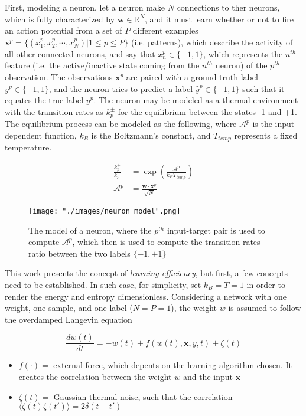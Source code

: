 First, modeling a neuron, let a neuron make $N$ connections to ther neurons, which is fully characterized by $\bm{w} \in \mathbb{R}^N$, and it must learn whether or not to fire an action potential from a set of $P$ different examples $\bm{x}^p = \{ (x_1^p,x_2^p,\cdots,x_N^p) | 1\leq p \leq P \}$ (i.e. patterns), which describe the activity of all other connected neurons, and say that $x^p_n \in \{ -1, 1\}$, which represents the $n^{th}$ feature (i.e. the active/inactive state coming from the $n^{th}$ neuron) of the $p^{th}$ observation. The observations $\bm{x}^p$ are paired with a ground truth label $y^p \in \{-1,1\}$, and the neuron tries to predict a label $\hat{y}^p \in \{-1,1\}$ such that it equates the true label $y^p$. The neuron may be modeled as a thermal environment with the transition rates as $k_p^\pm$ for the equilibrium between the states -1 and +1. The equilibrium process can be modeled as the following, where $\mathcal{A}^p$ is the input-dependent function, $k_B$ is the Boltzmann's constant, and $T_{temp}$ represents a fixed temperature.

\begin{align*}
  \frac{k_p^+}{k_p^-} &= \exp\left(\frac{\mathcal{A}^p}{k_B T_{temp}} \right) \\
  \mathcal{A}^p &= \frac{\bm{w} \cdot \bm{x}^p}{\sqrt{N}}
\end{align*}

\begin{figure}[h]
\begin{center}
    \texttt{[image: "./images/neuron\_model".png]}
    \caption{The model of a neuron, where the $p^{th}$ input-target pair is used to compute $\mathcal{A}^p$, which then is used to compute the transition rates ratio between the two labels $\{-1,+1\}$}
    \label{fig::model_neuron}
\end{center}
\end{figure}

This work presents the concept of \textit{learning efficiency}, but first, a few concepts need to be established. In such case, for simplicity, set $k_B = T = 1$ in order to render the energy and entropy dimensionless. Considering a network with one weight, one sample, and one label ($N=P=1$), the weight $w$ is assumed to follow the overdamped Langevin equation

$$ \frac{dw(t)}{dt} = - w(t) + f(w(t) , \bm{x}, y, t) + \zeta(t) $$

\begin{itemize}
    \item $f(\cdot) =$ external force, which depents on the learning algorithm chosen. It creates the correlation between the weight $w$ and the input $\bm{x}$
    \item $\zeta (t) = $ Gaussian thermal noise, such that the correlation $\langle \zeta(t)\zeta(t') \rangle = 2 \delta(t-t')$
\end{itemize}


